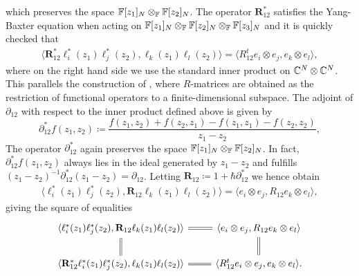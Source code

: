 which preserves the space $\mathbb{F}[z_1]_N \otimes_{\mathbb{F}} \mathbb{F}[z_2]_N$. The operator $\mathbf{R}_{12}^*$ satisfies the Yang-Baxter equation when acting on $\mathbb{F}[z_1]_N \otimes_{\mathbb{F}} \mathbb{F}[z_2]_N \otimes_{\mathbb{F}} \mathbb{F}[z_3]_N$ and it is quickly checked that
\begin{align}
\langle \mathbf{R}_{12}^* \ell_i^*(z_1) \ell_j^*(z_2), \ell_k(z_1) \ell_l(z_2) \rangle = \langle R_{12}^t e_i \otimes e_j, e_k \otimes e_l \rangle,
\end{align}
where on the right hand side we use the standard inner product on $\mathbb{C}^N \otimes \mathbb{C}^N$. This parallels the construction of \cite{felder_simple_1994}, where $R$-matrices are obtained as the restriction of functional operators to a finite-dimensional subspace. The adjoint of $\partial_{12}$ with respect to the inner product defined above is given by
\begin{equation}
\partial_{12}^* f(z_1,z_2) \coloneq \frac{f(z_1,z_2)+f(z_2,z_1)-f(z_1,z_1)-f(z_2,z_2)}{z_1-z_2},
\end{equation}
The operator $\partial_{12}^*$ again preserves the space $\mathbb{F}[z_1]_N \otimes_{\mathbb{F}} \mathbb{F}[z_2]_N$. In fact, $\partial_{12}^* f(z_1,z_2)$ always lies in the ideal generated by $z_1-z_2$ and fulfills $(z_1-z_2)^{-1} \partial_{12}^* (z_1-z_2) = \partial_{12}$. Letting $\mathbf{R}_{12} \coloneq 1 + \hbar\partial_{12}^*$ we hence obtain
\begin{align}
\langle \ell_i^*(z_1) \ell_j^*(z_2), \mathbf{R}_{12} \ell_k(z_1) \ell_l(z_2) \rangle = \langle e_i \otimes e_j, R_{12} e_k \otimes e_l \rangle,
\end{align}
giving the square of equalities
\begin{equation}
\begin{tikzcd}
\langle \ell_i^*(z_1) \ell_j^*(z_2), \mathbf{R}_{12} \ell_k(z_1) \ell_l(z_2) \rangle \arrow[equal]{r} \arrow[equal]{d} & \langle e_i \otimes e_j, R_{12} e_k \otimes e_l \rangle \arrow[equal]{d} \\
\langle \mathbf{R}_{12}^* \ell_i^*(z_1) \ell_j^*(z_2), \ell_k(z_1) \ell_l(z_2) \rangle \arrow[equal]{r} & \langle R_{12}^t e_i \otimes e_j, e_k \otimes e_l \rangle.
\end{tikzcd}
\end{equation}

